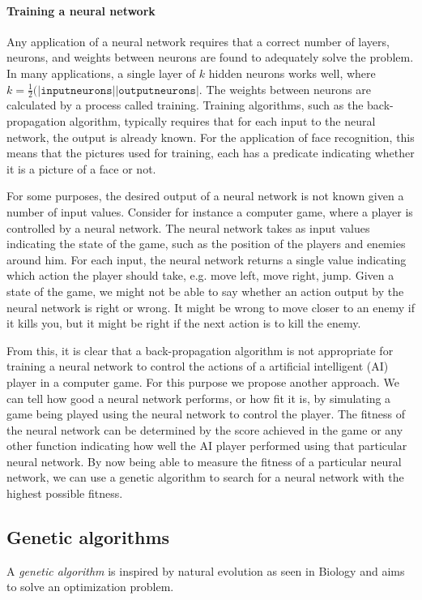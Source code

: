 \paragraph{Training a neural network}
Any application of a neural network requires that a correct number of layers, neurons, and weights between
neurons are found to adequately solve the problem. In many applications, a single layer of $k$ hidden neurons works well, where $k = \frac{1}{2}(|\mathtt{input neurons}| |\mathtt{output neurons}|$.
The weights between neurons are calculated by a process called training. Training algorithms, such as the
back-propagation algorithm, typically requires that for each input to the neural network, the output is already known.
For the application of face recognition, this means that the pictures used for training,
each has a predicate indicating whether it is a picture of a face or not.  

For some purposes, the desired output of a neural network is not known given a number of input values.
Consider for instance a computer game, where a player is controlled by a neural network. 
The neural network takes as input values indicating the state of the game, such as the position of the players
and enemies around him. For each input, the neural network returns a single value indicating which action the
player should take, e.g. move left, move right, jump. Given a state of the game, we might not be able to say
whether an action output by the neural network is right or wrong. It might be wrong to move closer to
an enemy if it kills you, but it might be right if the next action is to kill the enemy.

From this, it is clear that a back-propagation algorithm is not appropriate for training a neural network
to control the actions of a artificial intelligent (AI) player in a computer game. For this purpose
we propose another approach. We can tell how good a neural network performs, or how fit it is,
by simulating a game being played using the neural network to control the player. 
The fitness of the neural network can be determined by the score achieved in the game or
any other function indicating how well the AI player performed using that particular neural network.
By now being able to measure the fitness of a particular neural network, we can use a genetic algorithm
to search for a neural network with the highest possible fitness.

\subsection{Genetic algorithms}
A \emph{genetic algorithm} is inspired by natural evolution as seen in Biology and aims to solve
an optimization problem. 


